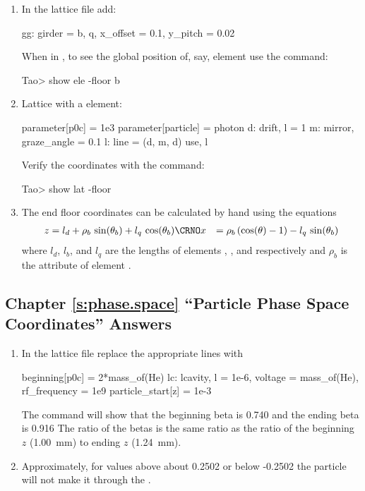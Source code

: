 \documentclass{hitec}     %
\begin{document}
\begin{enumerate}[label=\ref*{s:coords}.\arabic{enumi}]
\item
In the  lattice file add:
\begin{code}
gg: girder = {b, q}, x_offset = 0.1, y_pitch = 0.02
\end{code}
When in \tao, to see the global position of, say, element  use the command:
\begin{code}
Tao> show ele -floor b
\end{code}
%
\item
Lattice with a  element:
\begin{code}
parameter[p0c] = 1e3
parameter[particle] = photon
d: drift, l = 1
m: mirror, graze_angle = 0.1
l: line = (d, m, d)
use, l
\end{code}
Verify the coordinates with the command:
\begin{code}
Tao> show lat -floor
\end{code}
%
\item
The end floor coordinates can be calculated by hand using the equations
\begin{align}
  z &= l_d + \rho_b \, \sin(\theta_b) + l_q \, \cos(\theta_b) \CRNO
  x &= \rho_b \, (\cos(\theta) - 1) - l_q \, \sin(\theta_b)
\end{align}
where $l_d$, $l_b$, and $l_q$ are the lengths of elements , , and  respectively
and $\rho_b$ is the  attribute of element .
\end{enumerate}

\subsection[Chapter \ref*{s:phase.space.ex} ``Particle Phase Space Coordinates'']{Chapter \hyperref[s:phase.space.ex]{\ref*{s:phase.space}} ``Particle Phase Space Coordinates'' Answers}
\label{s:ans.phase}

\begin{enumerate}[label=\ref*{s:phase.space}.\arabic{enumi}]
\item
In the  lattice file replace the appropriate lines with
\begin{code}
beginning[p0c] = 2*mass_of(He)
lc: lcavity, l = 1e-6, voltage = mass_of(He), rf_frequency = 1e9
particle_start[z] = 1e-3
\end{code}
The command  will show that the beginning beta is 0.740 and the ending beta is 0.916
The ratio of the betas is the same ratio as the ratio of the beginning $z$ (1.00~mm) to ending $z$
(1.24~mm).
%
\item
Approximately, for  values above about 0.2502 or below -0.2502 the particle will not
make it through the .
\end{enumerate}
\end{document}
